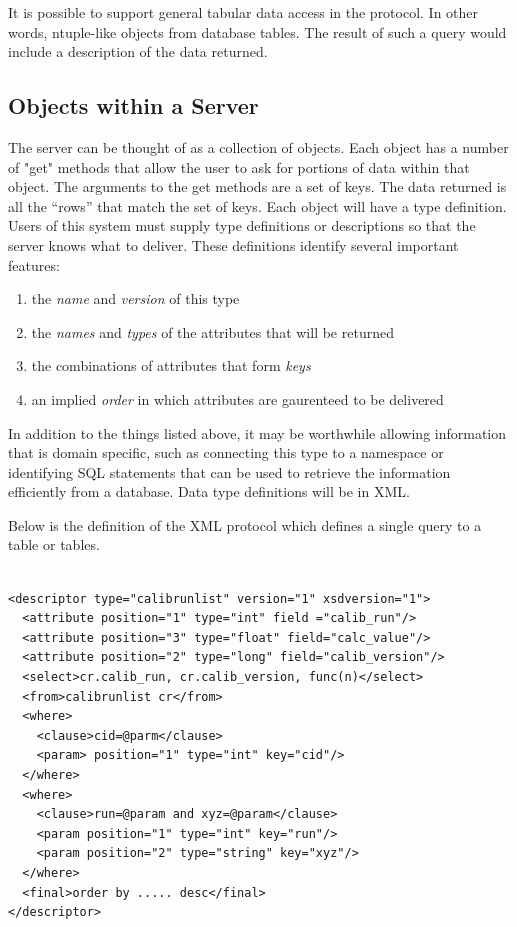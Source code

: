 It is possible to support general tabular data access in the
protocol. In other words, ntuple-like objects from database
tables. The result of such a query would include a description of the
data returned.

\subsection{Objects within a Server}

The server can be thought of as a collection of objects.  Each object has
a number of "get" methods that allow the user to ask for portions of data
within that object.  The arguments to the get methods are a set of keys.
The data returned is all the ``rows'' that match the set of keys.
Each object will have a type definition.  Users of this system must
supply type definitions or descriptions so that the server knows what
to deliver.  These definitions identify several important features:

\begin{enumerate}
\item the \emph{name} and \emph{version} of this type
\item the \emph{names} and \emph{types} of the attributes that will be
returned
\item the combinations of attributes that form \emph{keys}
\item an implied \emph{order} in which attributes are gaurenteed
to be delivered
\end{enumerate}

In addition to the things listed above, it may be worthwhile allowing
information that is domain specific, such as connecting this type
to a namespace or identifying SQL statements that can be used to
retrieve the information efficiently from a database.  Data type 
definitions will be in XML.

Below is the definition of the XML protocol which defines a single query
to a table or tables. 

\begin{verbatim}

<descriptor type="calibrunlist" version="1" xsdversion="1">
  <attribute position="1" type="int" field ="calib_run"/>
  <attribute position="3" type="float" field="calc_value"/>
  <attribute position="2" type="long" field="calib_version"/>
  <select>cr.calib_run, cr.calib_version, func(n)</select>
  <from>calibrunlist cr</from>
  <where>
    <clause>cid=@parm</clause>
    <param> position="1" type="int" key="cid"/>
  </where>
  <where>
    <clause>run=@param and xyz=@param</clause>
    <param position="1" type="int" key="run"/>
    <param position="2" type="string" key="xyz"/>
  </where>
  <final>order by ..... desc</final>
</descriptor>

\end{verbatim}

